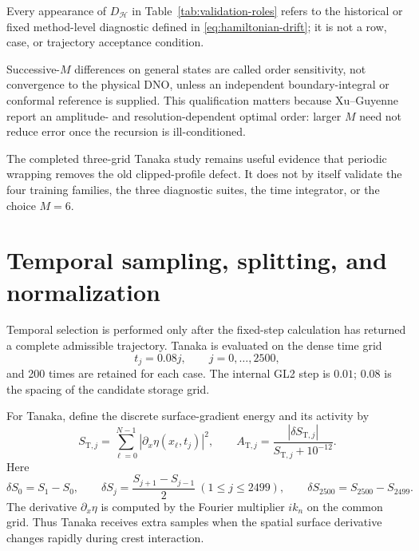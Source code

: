 \documentclass[11pt]{article}
\begin{document}
Every appearance of $D_{\mathcal H}$ in
Table~\ref{tab:validation-roles} refers to the historical or fixed
method-level diagnostic defined in \eqref{eq:hamiltonian-drift}; it is not a
row, case, or trajectory acceptance condition.

Successive-$M$ differences on general states are called order sensitivity,
not convergence to the physical DNO, unless an independent boundary-integral
or conformal reference is supplied.  This qualification matters because
Xu--Guyenne report an amplitude- and resolution-dependent optimal order:
larger $M$ need not reduce error once the recursion is ill-conditioned.

The completed three-grid Tanaka study remains useful evidence that periodic
wrapping removes the old clipped-profile defect.  It does not by itself
validate the four training families, the three diagnostic suites, the time
integrator, or the choice $M=6$.

\section{Temporal sampling, splitting, and normalization}
\label{sec:splitting}

Temporal selection is performed only after the fixed-step calculation has
returned a complete admissible trajectory.  Tanaka is evaluated on the dense
time grid
\begin{equation}
  t_j=0.08j,\qquad j=0,\ldots,2500,
  \label{eq:adaptive-dense-times}
\end{equation}
and 200 times are retained for each case.  The internal GL2 step
is $0.01$; $0.08$ is the spacing of the candidate storage grid.

For Tanaka, define the discrete surface-gradient energy and its activity by
\begin{equation}
  S_{\mathrm T,j}=\sum_{\ell=0}^{N-1}
    |\partial_x\eta(x_\ell,t_j)|^2,
  \qquad
  A_{\mathrm T,j}
  =\frac{|\delta S_{\mathrm T,j}|}{S_{\mathrm T,j}+10^{-12}}.
  \label{eq:tanaka-time-activity}
\end{equation}
Here
\[
  \delta S_0=S_1-S_0,\qquad
  \delta S_j=\frac{S_{j+1}-S_{j-1}}2\ (1\leq j\leq2499),\qquad
  \delta S_{2500}=S_{2500}-S_{2499}.
\]
The derivative $\partial_x\eta$ is computed by the Fourier multiplier
$ik_n$ on the common grid.  Thus Tanaka receives extra samples
when the spatial surface derivative changes rapidly during crest interaction.
\end{document}
